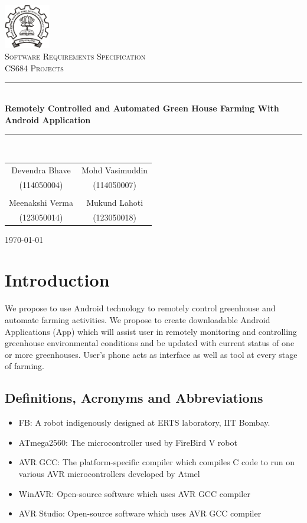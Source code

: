 \documentclass[a4paper, 12pt]{article}
\begin{document}
\begin{titlepage}
 \centering
 \includegraphics[width=0.15\textwidth]{./iitblogo}\\[1.5cm]
 \textsc{\LARGE Software Requirements Specification}\\[1.5cm]
 \textsc{\Large CS684 Projects} \\ [1.5cm]
 \rule{\linewidth}{0.5mm} \\ [0.5cm]
 {\LARGE \textbf{Remotely Controlled and Automated Green House Farming With Android Application}}
 \rule{\linewidth}{0.5mm}
 \\ [1.5cm]

 \large
 \begin{tabular}{cc}
  Devendra Bhave & Mohd Vasimuddin\\
  (114050004) & (114050007)\\
  \\
  Meenakshi Verma & Mukund Lahoti\\
  (123050014) & (123050018)
 \end{tabular}

 \vspace{2cm}
 \today
\end{titlepage}

\tableofcontents

\newpage

\section{Introduction}
We propose to use Android technology to remotely control greenhouse and automate
farming activities. We propose to create downloadable Android Applications (App)
which will assist user in remotely monitoring and controlling greenhouse environmental
conditions and be updated with current status of one or more greenhouses.
User's phone acts as interface as well as tool at every stage of farming.

\subsection{Definitions, Acronyms and Abbreviations}
\begin{itemize}
 \item FB: A robot indigenously designed at ERTS laboratory, IIT Bombay. \cite{fbhwmanual, fbswmanual, eyantra}
 \item ATmega2560: The microcontroller used by FireBird V robot
 \item AVR GCC: The platform-specific compiler which compiles C code to run on various AVR microcontrollers developed by Atmel
 \item WinAVR: Open-source software which uses AVR GCC compiler
 \item AVR Studio: Open-source software which uses AVR GCC compiler
\end{itemize}
\end{document}
